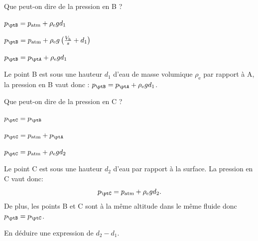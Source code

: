 \begin{enonce}	
Que peut-on dire de la pression en B ?	
	\begin{listeQCM3Colonnes}
	\item $p_\ptB=p_\text{atm} + \rho_\text{e}gd_1$
	\item $p_\ptB=p_\text{atm} + \rho_\text{e}g\left(\frac{V_\text{h}}{s}+d_1\right)$
	\item  $p_\ptB=p_\ptA + \rho_\text{e}gd_1$
	\end{listeQCM3Colonnes}
	\bigskip
\end{enonce}

\reponse{\reponseC}

\begin{corrige}
Le point B est sous une hauteur $d_1$ d'eau de masse volumique $\rho_\text{e}$ par rapport à A, la pression en B vaut donc :
$p_\ptB=p_\ptA + \rho_\text{e} g d_1$.
\end{corrige}

\begin{enonce}	
Que peut-on dire de la pression en C ?	
	\begin{listeQCM3Colonnes}
	\item $p_\ptC=p_\ptB$
	\item $p_\ptC=p_\text{atm}+p_\ptA$
	\item  $p_\ptC=p_\text{atm}+\rho_\text{e}gd_2$
	\end{listeQCM3Colonnes}
	\bigskip
\end{enonce}


\reponse{\reponseA{} \reponseC{}}

\begin{corrige}
Le point C est sous une hauteur $d_2$ d'eau par rapport à la surface. La pression en C vaut donc:
\[
p_\ptC=p_\text{atm} + \rho_\text{e}gd_2.
\]
De plus, les points B et C sont à la même altitude dans le même fluide donc $p_\ptB=p_\ptC$.
\end{corrige}


\begin{enonce}
En déduire une expression de $d_2-d_1$.
\end{enonce}

